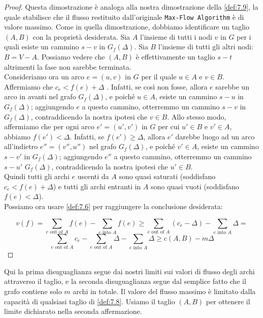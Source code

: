 \begin{proof}
  Questa dimostrazione è analoga alla nostra dimostrazione della \ref{def:7.9}, la
  quale stabilisce che il flusso restituito dall'originale
  \texttt{Max-Flow\ Algorithm} è di valore massimo. Come in quella
  dimostrazione, dobbiamo identificare un taglio $(A, B)$ con la
  proprietà desiderata. Sia $A$ l'insieme di tutti i nodi $v$ in $G$
  per i quali esiste un cammino $s-v$ in $G_f(\Delta)$. Sia $B$
  l'insieme di tutti gli altri nodi: $B = V - A$. Possiamo vedere che
  $(A, B)$ è effettivamente un taglio $s-t$ altrimenti la fase non
  sarebbe terminata.\\

  Consideriamo ora un arco $e = (u, v)$ in $G$ per il quale
  $u \in A$ e $v \in B$. Affermiamo che $c_e < f(e) + \Delta$ .
  Infatti, se così non fosse, allora $e$ sarebbe un arco in avanti nel
  grafo $G_f(\Delta)$, e poiché $u \in A$, esiste un cammino $s-u$
  in $G_f(\Delta)$; aggiungendo $e$ a questo cammino, otterremmo un
  cammino $s-v$ in $G_f(\Delta)$, contraddicendo la nostra ipotesi che
  $v \in B$. Allo stesso modo, affermiamo che per ogni arco
  $e' = (u' , v')$ in $G$ per cui $u' \in B$ e $v' \in A$, abbiamo
  $f(e') < \Delta$. Infatti, se $f(e') \ge \Delta$, allora $e'$
  darebbe luogo ad un arco all'indietro $e'' = (v'' , u'')$ nel grafo
  $G_f(\Delta)$, e poiché $v' \in A$, esiste un cammino $s-v'$ in
  $G_f(\Delta)$; aggiungendo $e''$ a questo cammino, otterremmo un
  cammino $s-u'$ $G_f(\Delta)$, contraddicendo la nostra ipotesi che
  $u' \in B$.\\

  Quindi tutti gli archi $e$ uscenti da $A$ sono quasi saturati
  (soddisfano $c_e < f(e) + \Delta$) e tutti gli archi entranti in $A$
  sono quasi vuoti (soddisfano $f(e) < \Delta$).\\

  Possiamo ora usare \ref{def:7.6} per raggiungere la conclusione desiderata:

  $$
    v(f) = \sum_{e \text{ out of } A}f(e) - \sum_{e \text{ into } A}f(e) \ge \sum_{e \text{ out of } A}(c_e - \Delta) - \sum_{e \text{ into } A}\Delta =
  $$
  $$
    \sum_{e \text{ out of } A}c_e - \sum_{e \text{ out of } A}\Delta - \sum_{e \text{ into } A}\Delta \ge c(A, B) - m\Delta
  $$
\end{proof}

Qui la prima disuguaglianza segue dai nostri limiti sui valori di flusso
degli archi attraverso il taglio, e la seconda disuguaglianza segue dal
semplice fatto che il grafo contiene solo $m$ archi in totale. Il
valore del flusso massimo è limitato dalla capacità di qualsiasi taglio
di \ref{def:7.8}. Usiamo il taglio $(A, B)$ per ottenere il limite dichiarato
nella seconda affermazione.

